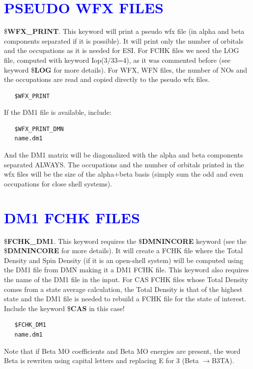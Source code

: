 \documentclass[10pt,a4paper]{article}
\newcommand{\tbl}[1]{{\textcolor{blue}{#1}}}
\begin{document}
{\section{\tbl{\textbf{PSEUDO WFX FILES}}}
\noindent \$\textbf{WFX\_PRINT}. This keyword will print a pseudo wfx file (in alpha and beta components separated if it is possible). It will print only the number of orbitals and the occupations as it is needed for ESI. For FCHK files we need the LOG file, computed with keyword Iop(3/33=4), as it was commented before (see keyword \$\textbf{LOG} for more details). For WFX, WFN files, the number of NOs and the occupations are read and copied directly to the pseudo wfx files.   
\begin{verbatim}
   $WFX_PRINT
\end{verbatim}
If the DM1 file is available, include:
\begin{verbatim}
   $WFX_PRINT_DMN
   name.dm1
\end{verbatim}
And the DM1 matrix will be diagonalized with the alpha and beta components separated ALWAYS. The occupations and the number of orbitals printed in the wfx files will be the size of the alpha$+$beta basis (simply sum the odd and even occupations for close shell systems).   
\section{\tbl{\textbf{DM1 FCHK FILES}}}
\noindent \$\textbf{FCHK\_DM1}. This keyword requires the \$\textbf{DMNINCORE} keyword (see the \$\textbf{DMNINCORE} for more details). It will create a FCHK file where the Total Density and Spin Density (if it is an open-shell system) will be computed using the DM1 file from DMN making it a DM1 FCHK file. This keyword also requires the name of the DM1 file in the input. For CAS FCHK files whose Total Density comes from a state average calculation, the Total Density is that of the highest state and the DM1 file is needed to rebuild a FCHK file for the state of interest. Include the keyword \$\textbf{CAS} in this case!    
\begin{verbatim}
   $FCHK_DM1
   name.dm1
\end{verbatim}
Note that if Beta MO coefficients and Beta MO energies are present, the word Beta is rewriten using capital letters and replacing E for 3 (Beta $\rightarrow$B3TA).
}
\end{document}
